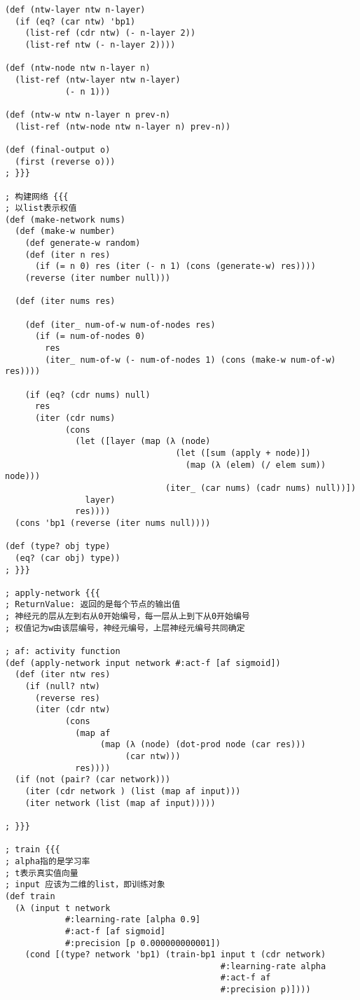 \documentclass{article}
\begin{document}
\begin{lstlisting}
(def (ntw-layer ntw n-layer)
  (if (eq? (car ntw) 'bp1)
    (list-ref (cdr ntw) (- n-layer 2))
    (list-ref ntw (- n-layer 2))))

(def (ntw-node ntw n-layer n)
  (list-ref (ntw-layer ntw n-layer)
            (- n 1)))

(def (ntw-w ntw n-layer n prev-n)
  (list-ref (ntw-node ntw n-layer n) prev-n))

(def (final-output o)
  (first (reverse o)))
; }}}

; 构建网络 {{{
; 以list表示权值
(def (make-network nums)
  (def (make-w number)
    (def generate-w random)
    (def (iter n res)
      (if (= n 0) res (iter (- n 1) (cons (generate-w) res))))
    (reverse (iter number null)))

  (def (iter nums res)

    (def (iter_ num-of-w num-of-nodes res)
      (if (= num-of-nodes 0)
        res
        (iter_ num-of-w (- num-of-nodes 1) (cons (make-w num-of-w) res))))

    (if (eq? (cdr nums) null)
      res
      (iter (cdr nums)
            (cons
              (let ([layer (map (λ (node)
                                  (let ([sum (apply + node)])
                                    (map (λ (elem) (/ elem sum)) node)))
                                (iter_ (car nums) (cadr nums) null))])
                layer)
              res))))
  (cons 'bp1 (reverse (iter nums null))))

(def (type? obj type)
  (eq? (car obj) type))
; }}}

; apply-network {{{
; ReturnValue: 返回的是每个节点的输出值
; 神经元的层从左到右从0开始编号，每一层从上到下从0开始编号
; 权值记为w由该层编号，神经元编号，上层神经元编号共同确定

; af: activity function
(def (apply-network input network #:act-f [af sigmoid])
  (def (iter ntw res)
    (if (null? ntw)
      (reverse res)
      (iter (cdr ntw)
            (cons
              (map af
                   (map (λ (node) (dot-prod node (car res)))
                        (car ntw)))
              res))))
  (if (not (pair? (car network)))
    (iter (cdr network ) (list (map af input)))
    (iter network (list (map af input)))))

; }}}

; train {{{
; alpha指的是学习率
; t表示真实值向量
; input 应该为二维的list，即训练对象
(def train
  (λ (input t network
            #:learning-rate [alpha 0.9]
            #:act-f [af sigmoid]
            #:precision [p 0.000000000001])
    (cond [(type? network 'bp1) (train-bp1 input t (cdr network)
                                           #:learning-rate alpha
                                           #:act-f af
                                           #:precision p)])))


\end{lstlisting}
\end{document}
